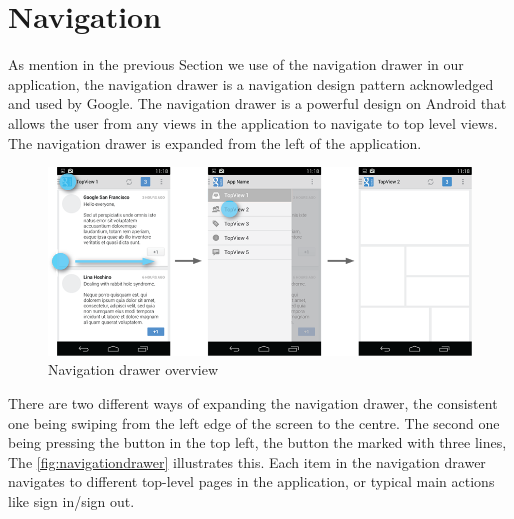 \section{Navigation}\label{sec:navigation}
As mention in the previous Section we use of the navigation drawer in our application, the navigation drawer is a navigation design pattern acknowledged and used by Google.\cite{guidelines-navigationdrawer}
The navigation drawer is a powerful design on Android that allows the user from any views in the application to navigate to top level views. The navigation drawer is expanded from the 
left of the application.
\begin{figure}[H]
\centering
\includegraphics[width=0.9\linewidth]{img/screenshots/navigation_drawer_overview.png}
\caption{Navigation drawer overview}
\label{fig:navigationdrawer}
\end{figure}
 There are two different ways of expanding the navigation drawer, the consistent one being swiping from the left edge of the screen to the centre. The second one being pressing the button in the top left, the button the marked with three lines, The \autoref{fig:navigationdrawer} illustrates this. Each item in the navigation drawer navigates to different top-level pages in the application, or typical main actions like sign in/sign out. 
